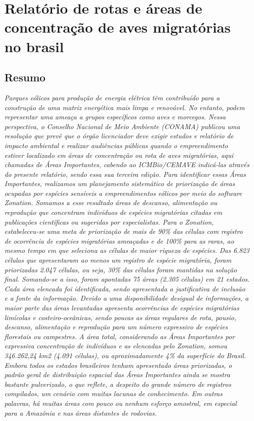 \documentclass[
  oneside]{scrbook}
\begin{document}
\hypertarget{aves}{%
\chapter{Relatório de rotas e áreas de concentração de aves migratórias no brasil}\label{aves}}

\pagestyle{headings}

\hypertarget{resumo}{%
\section*{Resumo}\label{resumo}}

\emph{Parques eólicos para produção de energia elétrica têm contribuído para a construção de uma matriz energética mais limpa e renovável. No entanto, podem representar uma ameaça a grupos específicos como aves e morcegos. Nessa perspectiva, o Conselho Nacional de Meio Ambiente (CONAMA) publicou uma resolução que prevê que o órgão licenciador deve exigir estudos e relatório de impacto ambiental e realizar audiências públicas quando o empreendimento estiver localizado em áreas de concentração ou rota de aves migratórias, aqui chamadas de Áreas Importantes, cabendo ao ICMBio/CEMAVE indicá-las através do presente relatório, sendo essa sua terceira edição. Para identificar essas Áreas Importantes, realizamos um planejamento sistemático de priorização de áreas ocupadas por espécies sensíveis a empreendimentos eólicos por meio do software Zonation. Somamos a esse resultado áreas de descanso, alimentação ou reprodução que concentram indivíduos de espécies migratórias citadas em publicações científicas ou sugeridas por especialistas. Para o Zonation, estabeleceu-se uma meta de priorização de mais de 90\% das células com registro de ocorrência de espécies migratórias ameaçadas e de 100\% para as raras, ao mesmo tempo em que seleciona as células de maior riqueza de espécies. Das 6.823 células que apresentaram ao menos um registro de espécie migratória, foram priorizadas 2.047 células, ou seja, 30\% das células foram mantidas na solução final. Somando-se a isso, foram apontadas 75 áreas (2.305 células) em 21 estados. Cada área elencada foi identificada, sendo apresentada a justificativa de inclusão e a fonte da informação. Devido a uma disponibilidade desigual de informações, a maior parte das áreas levantadas apresenta ocorrências de espécies migratórias limícolas e costeiro-oceânicas, sendo poucas as áreas regulares de rota, pousio, descanso, alimentação e reprodução para um número expressivo de espécies florestais ou campestres. A área total, considerando as Áreas Importantes por expressiva concentração de indivíduos e as elencadas pelo Zonation, somou 346.262,24 km2 (4.091 células), ou aproximadamente 4\% da superfície do Brasil. Embora todos os estados brasileiros tenham apresentado áreas priorizadas, o padrão geral de distribuição espacial das Áreas Importantes ainda se mostra bastante pulverizado, o que reflete, a despeito do grande número de registros compilados, um cenário com muitas lacunas de conhecimento. Em outras palavras, há muitas áreas com pouco ou nenhum esforço amostral, em especial para a Amazônia e nas áreas distantes de rodovias.}
\end{document}

